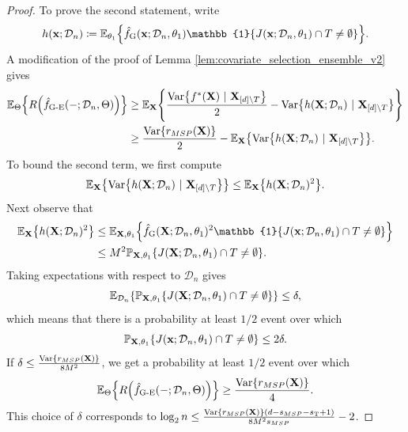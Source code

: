 \documentclass[11pt]{article}
\newcommand{\bx}{\mathbf{x}}
\newcommand{\bX}{\mathbf{X}}
\DeclarePairedDelimiter{\braces}{\lbrace}{\rbrace}
\DeclarePairedDelimiter{\paren}{(}{)}
\renewcommand{\P}{\mathbb{P}}
\newcommand{\E}{\mathbb{E}}
\newcommand{\indicator}{\mathbb{1}}
\newcommand{\Var}{\operatorname{Var}}
\newcommand{\sparsity}{s}
\newcommand{\nfeats}{d}
\newcommand{\nsamples}{n}
\newcommand{\coordindices}{[\nfeats]}
\newcommand{\data}[1][n]{\mathcal{D}_{#1}}
\newcommand{\MSP}{\textsf{MSP}}
\newcommand{\fgreedy}{\hat{f}_{\operatorname{G}}}
\newcommand{\rfparam}{\Theta}
\newcommand{\traversal}{T}
\newcommand{\fgre}{\hat f_{\operatorname{G-E}}}
\newcommand{\traversalsize}{\sparsity_{\operatorname{T}}}
\begin{document}
\begin{proof}
    To prove the second statement, write
    \begin{equation}
        h(\bx;\data) \coloneqq \E_{\theta_1}\braces*{\fgreedy(\bx;\data,\theta_1)\indicator\braces*{J(\bx;\data,\theta_1)\cap \traversal \neq \emptyset }}.
    \end{equation}
    A modification of the proof of Lemma \ref{lem:covariate_selection_ensemble_v2} gives
    \begin{equation}
    \begin{split}
        \E_{\rfparam}\braces*{R\paren*{\fgre(-;\data,\rfparam)}} & \geq \E_{\bX}\braces*{\frac{\Var\braces*{f^*(\bX)~|~\bX_{\coordindices\backslash\traversal}}}{2} - \Var\braces*{h(\bX;\data)~|~\bX_{\coordindices\backslash\traversal}}} \\
        & \geq \frac{\Var\braces*{r_{\MSP}(\bX)}}{2} - \E_{\bX}\braces*{\Var\braces*{h(\bX;\data)~|~\bX_{\coordindices\backslash\traversal}}}.
    \end{split}
    \end{equation}
    To bound the second term, we first compute
    \begin{equation}
        \E_{\bX}\braces*{\Var\braces*{h(\bX;\data)~|~\bX_{\coordindices\backslash\traversal}}} \leq \E_\bX\braces*{h(\bX;\data)^2}.
    \end{equation}
    Next observe that
    \begin{equation}
    \begin{split}
        \E_\bX\braces*{h(\bX;\data)^2} & \leq \E_{\bX,\theta_1}\braces*{\fgreedy(\bX;\data,\theta_1)^2\indicator\braces*{J(\bx;\data,\theta_1)\cap \traversal \neq \emptyset }} \\
        & \leq M^2\P_{\bX,\theta_1}\braces*{J(\bX;\data,\theta_1)\cap \traversal \neq \emptyset }.
    \end{split}
    \end{equation}
    Taking expectations with respect to $\data$ gives
    \begin{equation}
        \E_{\data}\braces*{\P_{\bX,\theta_1}\braces*{J(\bX;\data,\theta_1)\cap \traversal \neq \emptyset }} \leq \delta,
    \end{equation}
    which means that there is a probability at least $1/2$ event over which
    \begin{equation}
        \P_{\bX,\theta_1}\braces*{J(\bx;\data,\theta_1)\cap \traversal \neq \emptyset } \leq 2\delta.
    \end{equation}
    If $\delta \leq \frac{\Var\braces*{r_{\MSP}(\bX)}}{8M^2}$, we get a probability at least $1/2$ event over which
    \begin{equation}
        \E_{\rfparam}\braces*{R\paren*{\fgre(-;\data,\rfparam)}} \geq \frac{\Var\braces*{r_{\MSP}(\bX)}}{4}.
    \end{equation}
    This choice of $\delta$ corresponds to $\log_2\nsamples \leq \frac{\Var\braces{r_{\MSP}(\bX)}(\nfeats-s_{\MSP}-\traversalsize+1)}{8M^2s_{\MSP}} - 2$.
\end{proof}
\end{document}
